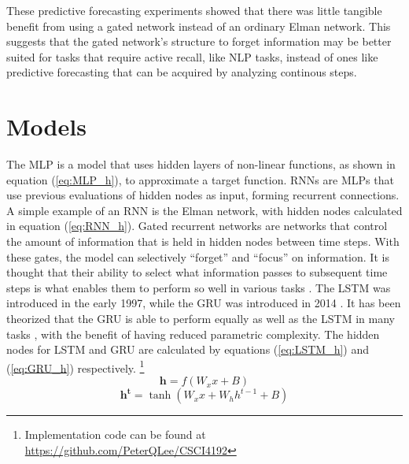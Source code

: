\documentclass[11pt]{article}
\begin{document}
These predictive forecasting experiments showed that there was
little tangible benefit from using a gated network instead of an
ordinary Elman network. This suggests that
the gated network's structure to forget information may be
better suited for tasks that require active recall, like NLP tasks, instead of ones like
predictive forecasting that can be acquired by analyzing continous steps.

\section{Models}
The MLP is a model that uses hidden layers of non-linear functions, as shown in equation (\ref{eq:MLP_h}),
to approximate a target function. RNNs are MLPs that use previous evaluations
of hidden nodes as input, forming recurrent connections. A simple example of an RNN is the Elman network, with hidden nodes calculated in
equation (\ref{eq:RNN_h}).
Gated recurrent networks are networks that control the
amount of information that is held in hidden nodes between time
steps. With these gates, the model can selectively ``forget''
and ``focus'' on information. It is thought that their ability to select what information
passes to subsequent time steps is what enables them to perform so
well in various tasks \cite{LSTM}. The LSTM was introduced in the early
1997, while the GRU was introduced in 2014 \cite{GRU}. It has been theorized
that the GRU is able to perform equally as well as the LSTM in many tasks \cite{Chung}, with the benefit of having reduced parametric complexity. 
The hidden nodes for
LSTM and GRU are calculated by equations (\ref{eq:LSTM_h}) and (\ref{eq:GRU_h})
respectively. \footnote{Implementation code can be found at \url{https://github.com/PeterQLee/CSCI4192}}
\begin{equation}
\mathbf{h} = f( W_xx+B)
\label{eq:MLP_h}
\end{equation}
\begin{equation}
\mathbf{h^t} = \tanh(W_xx+W_hh^{t-1}+B)
\label{eq:RNN_h}
\end{equation}
\end{document}
